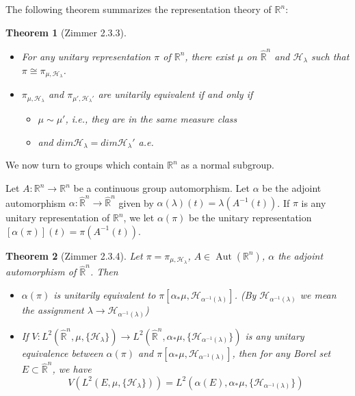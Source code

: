 \documentclass[
  12pt
]{article}
\numberwithin{equation}{section}
\newtheorem{thm}{Theorem}[section]
\theoremstyle{plain}
\newcommand{\mpi}{\ensuremath{\pi}\xspace}
\newcommand{\bbr}{\ensuremath{\mathbb{R}}\xspace}
\newcommand{\hilb}{\ensuremath{\mathscr{H}}\xspace}
\DeclareMathOperator{\Aut}{Aut}
\begin{document}
  The following theorem summarizes the representation theory of $\bbr^n$:

  \begin{thm}[Zimmer 2.3.3]
    \label{thm:2.3.3}
    \begin{itemize}
      \item For any unitary representation $\pi$ of
        $\mathbb{R}^n$, there exist $\mu$ on $\hat{\mathbb{R}}^n$ and $\mathscr{H}_{\lambda}$
        such that $\pi \cong \pi_{\mu, \mathscr{H}_{\lambda}}$.
      \item $\pi_{\mu, \mathscr{H}_{\lambda}}$ and
        $\pi_{\mu', \mathscr{H}_{\lambda}'}$ are unitarily equivalent if and only if 
        \begin{itemize}
          \item $\mu \sim \mu'$, i.e., they are in the same measure class
          \item and $dim\mathscr{H}_{\lambda} = dim \mathscr{H}_{\lambda}'$ a.e.
        \end{itemize}
    \end{itemize}
  \end{thm}

  We now turn to groups which contain $\bbr^n$ as a normal subgroup.

  Let $A:\bbr^n \rightarrow \bbr^n$ be a continuous group automorphism. Let
  $\alpha$ be the adjoint automorphism $\alpha:\hat{\bbr}^n \rightarrow \hat{\bbr}^n$ given
  by $\alpha(\lambda)(t) = \lambda(A^{-1}(t))$. If \mpi is any unitary
  representation of $\bbr^n$, we let $\alpha(\pi)$  be the unitary
  representation $[\alpha(\pi)](t) = \pi(A^{-1}(t))$.


  \begin{thm}[Zimmer 2.3.4]
    \label{thm:2.3.4}
    Let $\pi = \pi_{\mu, \hilb_{\lambda}}$, $A\in  \Aut(\bbr^n)$, $\alpha$ the
    adjoint automorphism of $\hat{\bbr}^n$. Then
    \begin{itemize}
      \item $\alpha(\pi)$ is unitarily equivalent to $\pi[\alpha_*\mu, \hilb_{\alpha^{-1}(\lambda)}]$. (By $\hilb_{\alpha^{-1}(\lambda)}$ we mean the assignment $\lambda \rightarrow \hilb_{\alpha^{-1}(\lambda)}$)
      \item If $V:L^2(\hat{\bbr}^n, \mu, \{\hilb_{\lambda}\}) \rightarrow L^2(\hat{\bbr}^n, \alpha_*\mu, \{\hilb_{\alpha^{-1}(\lambda)}\})$ is any unitary equivalence between $\alpha(\pi)$ and $\pi[\alpha_*\mu, \hilb_{\alpha^{-1}(\lambda)}]$, then for any Borel set $E \subset \hat{\bbr}^n$, we have
        $$
        V(L^2(E, \mu, \{\hilb_{\lambda}\})) = L^2(\alpha(E), \alpha_*\mu, \{\hilb_{\alpha^{-1}(\lambda)}\})
        $$
    \end{itemize}
  \end{thm}
\end{document}

